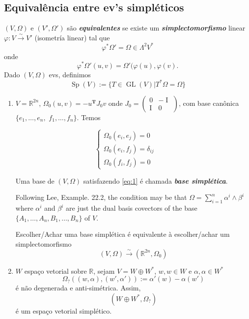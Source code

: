 \subsection{Equival\^encia entre ev's simpl\'eticos}

$(V,\Omega)$ e $(V',\Omega')$ s\~ao \textit{\textbf{equivalentes}} se existe um \textit{\textbf{simplectomorfismo}} linear $\varphi :V\overset{\sim}{\to }V'$ (isometr\'ia linear) tal que
	\[\varphi^{*}\Omega'=\Omega\in \Lambda^{2} V^{*}\] 
onde
\[\varphi^{*} \Omega'(u,v)=\Omega'(\varphi(u),\varphi(v).\]
Dado $(V,\Omega)$ evs, definimos
\[\operatorname{Sp}(V):=\{T\in \operatorname{GL}(V)|T^{*} \Omega=\Omega\} \]
\begin{example}\leavevmode 
	\begin{enumerate}
	\item $V=\mathbb{R}^{2n}$, $\Omega_0(u,v)=-u^{\mathbf{T}} J_0v$ onde $J_0=\begin{pmatrix}0&-\operatorname{I}\\\operatorname{I}&0\end{pmatrix}$, com base can\^onica $\{e_1,\ldots,e_n,$ $f_1,\ldots,f_n\} $. Temos

\begin{equation}\label{eq:1}
	\begin{cases}
				\Omega_0(e_i,e_{j})=0\\
				\Omega_0(e_i,f_j)=\delta_{ij} \\
				\Omega_0(f_i,f_j)=0
				\qquad &
			\end{cases}
\end{equation}

\begin{defn}
	Uma base de $(V,\Omega)$ satisfazendo \cref{eq:1} \'e chamada \textit{\textbf{base simpl\'etica}}.
\end{defn}

Following Lee, Example. 22.2, the condition may be that $\Omega=\sum_{i=1}^{n} \alpha^{i} \wedge \beta^{i}$ where $\alpha^{i}$ and $\beta^{i}$ are just the dual basis covectors of the base $\{A_{1},\ldots,A_{n},B_1,\ldots,B_{n}\} $ of $V$.

\begin{remark}\leavevmode 
		Escolher/Achar uma base simpl\'etica \'e equivalente \`a escolher/achar um simplectomorfismo
	\[(V,\Omega)\overset{\sim}{\to }(\mathbb{R}^{2n},\Omega_{0})\]
\end{remark}

	\item $W$ espa\c co vetorial sobre $\mathbb{R}$, sejam $V=W\oplus W^{*}$, $w,w\in W$ e $\alpha,\alpha \in W^{*}$
		\[\Omega_{\operatorname{?}}( (w,\alpha),(w',\alpha')):=\alpha'(w)-\alpha(w')\]
		\'e n\~ao degenerada e anti-sim\'etrica. Assim,
		\[(W\oplus W^{*},\Omega_{?})\]
	\'e um espa\c co vetorial simpl\'etico.


\end{enumerate}
\end{example}
